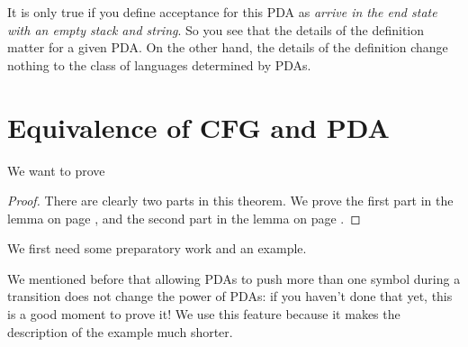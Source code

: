 It is only true if you define acceptance for this PDA as {\em arrive
  in the end state with an empty stack and string}. So you see that
the details of the definition matter for a given PDA. On the other
hand, the details of the definition change nothing to the class of
languages determined by PDAs.


\section{Equivalence of CFG and PDA}

We want to prove

\begin{proof}
There are clearly two parts in this theorem. We prove the first part
in the lemma on page \pageref{equicfgpda1}, and the second part in the lemma on page \pageref{equicfgpda2}. \end{proof}

We first need some preparatory work and an example.

We mentioned before that allowing PDAs to push more than one symbol
during a transition does not change the power of PDAs: if you haven't
done that yet, this is a good moment to prove it! We use this feature
because it makes the description of the example much shorter.

